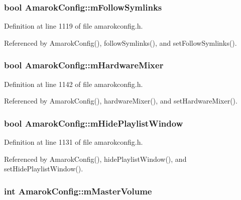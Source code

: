 \subsubsection{\setlength{\rightskip}{0pt plus 5cm}bool {\bf Amarok\-Config::m\-Follow\-Symlinks}\hspace{0.3cm}{\tt  [protected]}}\label{classAmarokConfig_AmarokConfigp5}




Definition at line 1119 of file amarokconfig.h.

Referenced by Amarok\-Config(), follow\-Symlinks(), and set\-Follow\-Symlinks().
\subsubsection{\setlength{\rightskip}{0pt plus 5cm}bool {\bf Amarok\-Config::m\-Hardware\-Mixer}\hspace{0.3cm}{\tt  [protected]}}\label{classAmarokConfig_AmarokConfigp26}




Definition at line 1142 of file amarokconfig.h.

Referenced by Amarok\-Config(), hardware\-Mixer(), and set\-Hardware\-Mixer().
\subsubsection{\setlength{\rightskip}{0pt plus 5cm}bool {\bf Amarok\-Config::m\-Hide\-Playlist\-Window}\hspace{0.3cm}{\tt  [protected]}}\label{classAmarokConfig_AmarokConfigp17}




Definition at line 1131 of file amarokconfig.h.

Referenced by Amarok\-Config(), hide\-Playlist\-Window(), and set\-Hide\-Playlist\-Window().
\subsubsection{\setlength{\rightskip}{0pt plus 5cm}int {\bf Amarok\-Config::m\-Master\-Volume}\hspace{0.3cm}{\tt  [protected]}}\label{classAmarokConfig_AmarokConfigp25}




